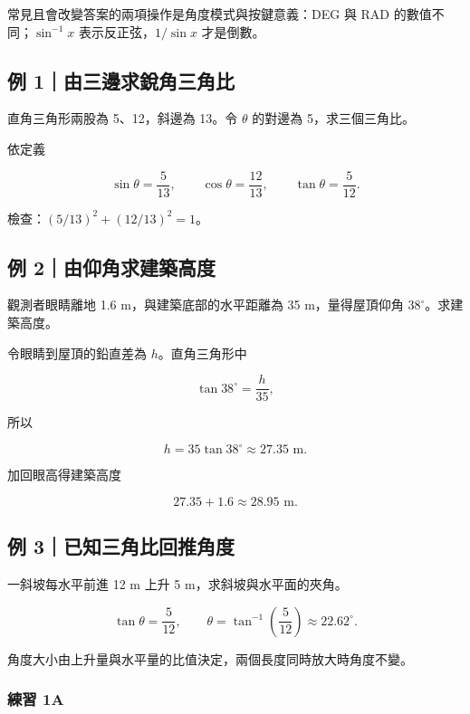 \documentclass[11pt,a4paper]{article}
\begin{document}
常見且會改變答案的兩項操作是角度模式與按鍵意義：DEG 與 RAD 的數值不同；\(\sin^{-1}x\) 表示反正弦，\(1/\sin x\) 才是倒數。

\subsection{例 1｜由三邊求銳角三角比}\label{ux4f8b-1ux7531ux4e09ux908aux6c42ux92b3ux89d2ux4e09ux89d2ux6bd4}

直角三角形兩股為 5、12，斜邊為 13。令 \(\theta\) 的對邊為 5，求三個三角比。

依定義

\[
\boxed{\sin\theta=\frac5{13}},\qquad
\boxed{\cos\theta=\frac{12}{13}},\qquad
\boxed{\tan\theta=\frac5{12}}.
\]

檢查：\((5/13)^2+(12/13)^2=1\)。

\subsection{例 2｜由仰角求建築高度}\label{ux4f8b-2ux7531ux4ef0ux89d2ux6c42ux5efaux7bc9ux9ad8ux5ea6}

觀測者眼睛離地 1.6 m，與建築底部的水平距離為 35 m，量得屋頂仰角 \(38^\circ\)。求建築高度。

令眼睛到屋頂的鉛直差為 \(h\)。直角三角形中

\[
\tan38^\circ=\frac{h}{35},
\]

所以

\[
h=35\tan38^\circ\approx27.35\text{ m}.
\]

加回眼高得建築高度

\[
\boxed{27.35+1.6\approx28.95\text{ m}}.
\]

\subsection{例 3｜已知三角比回推角度}\label{ux4f8b-3ux5df2ux77e5ux4e09ux89d2ux6bd4ux56deux63a8ux89d2ux5ea6}

一斜坡每水平前進 12 m 上升 5 m，求斜坡與水平面的夾角。

\[
\tan\theta=\frac5{12},\qquad
\theta=\tan^{-1}\!\left(\frac5{12}\right)\approx\boxed{22.62^\circ}.
\]

角度大小由上升量與水平量的比值決定，兩個長度同時放大時角度不變。

\subsubsection{練習 1A}\label{ux7df4ux7fd2-1a}
\end{document}
